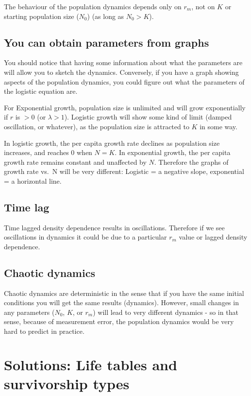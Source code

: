 \documentclass[
  a4paper]{book}
\begin{document}
The behaviour of the population dynamics depends only on \(r_m\), not on \(K\) or starting population size (\(N_0\)) (as long as \(N_0 > K\)).

\subsection{You can obtain parameters from graphs}\label{you-can-obtain-parameters-from-graphs}

You should notice that having some information about what the parameters are will allow you to sketch the dynamics. Conversely, if you have a graph showing aspects of the population dynamics, you could figure out what the parameters of the logistic equation are.

For Exponential growth, population size is unlimited and will grow exponentially if \(r\) is \(>0\) (or \(\lambda > 1\)). Logistic growth will show some kind of limit (damped oscillation, or whatever), as the population size is attracted to \(K\) in some way.

In logistic growth, the per capita growth rate declines as population size increases, and reaches \(0\) when \(N = K\). In exponential growth, the per capita growth rate remains constant and unaffected by \(N\). Therefore the graphs of growth rate vs.~N will be very different: Logistic = a negative slope, exponential = a horizontal line.

\subsection{Time lag}\label{time-lag}

Time lagged density dependence results in oscillations. Therefore if we see oscillations in dynamics it could be due to a particular \(r_m\) value or lagged density dependence.

\subsection{Chaotic dynamics}\label{chaotic-dynamics}

Chaotic dynamics are deterministic in the sense that if you have the same initial conditions you will get the same results (dynamics). However, small changes in any parameters (\(N_0\), \(K\), or \(r_m\)) will lead to very different dynamics - so in that sense, because of measurement error, the population dynamics would be very hard to predict in practice.

\section{Solutions: Life tables and survivorship types}\label{solutions-life-tables-and-survivorship-types}
\end{document}
